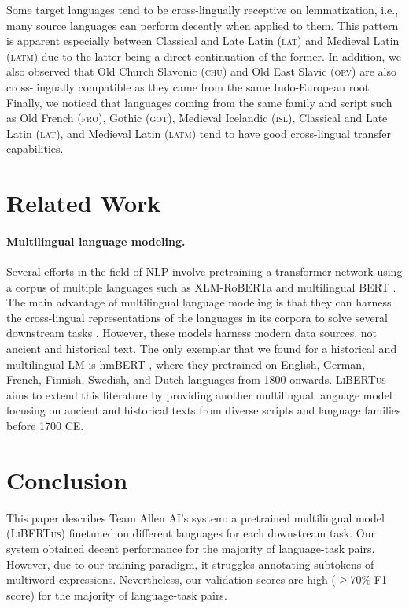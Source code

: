 \documentclass[11pt]{article}
\newcommand{\libertus}{\textsc{LiBERTus}}
\newcommand{\teamname}{Allen AI}
\begin{document}
Some target languages tend to be cross-lingually receptive on lemmatization, i.e., many source languages can perform decently when applied to them.
This pattern is apparent especially between Classical and Late Latin (\textsc{lat}) and Medieval Latin (\textsc{latm}) due to the latter being a direct continuation of the former.
In addition, we also observed that Old Church Slavonic (\textsc{chu}) and Old East Slavic (\textsc{orv}) are also cross-lingually compatible as they came from the same Indo-European root.
Finally, we noticed that languages coming from the same family and script such as Old French (\textsc{fro}), Gothic (\textsc{got}), Medieval Icelandic (\textsc{isl}), Classical and Late Latin (\textsc{lat}), and Medieval Latin (\textsc{latm}) tend to have good cross-lingual transfer capabilities.

\section{Related Work}

\paragraph{Multilingual language modeling.}
Several efforts in the field of NLP involve pretraining a transformer network \cite{vaswani-etal-2017-attention} using a corpus of multiple languages such as XLM-RoBERTa \cite{liu-etal-2019-roberta} and multilingual BERT \cite{conneau-etal-2020-unsupervised}.
The main advantage of multilingual language modeling is that they can harness the cross-lingual representations of the languages in its corpora to solve several downstream tasks \cite{chang-etal-2022-geometry}.
However, these models harness modern data sources, not ancient and historical text.
The only exemplar that we found for a historical and multilingual LM is hmBERT \cite{schweter-etal-2022-hmbert}, where they pretrained on English, German, French, Finnish, Swedish, and Dutch languages from 1800 onwards.
\libertus{} aims to extend this literature by providing another multilingual language model focusing on ancient and historical texts from diverse scripts and language families before 1700 CE.

\section{Conclusion}

This paper describes Team \teamname{}'s system: a pretrained multilingual model (\libertus{}) finetuned on different languages for each downstream task.
Our system obtained decent performance for the majority of language-task pairs.
However, due to our training paradigm, it struggles annotating subtokens of multiword expressions.
Nevertheless, our validation scores are high ($\geq$70\% F1-score) for the majority of language-task pairs.
\end{document}

